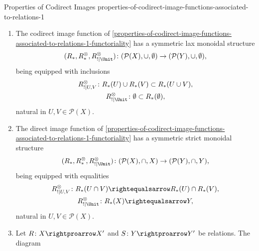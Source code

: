 \begin{proposition}{Properties of Codirect Images \rmI}{properties-of-codirect-image-functions-associated-to-relations-1}
\begin{enumerate}
\[            \]%
            natural in $U,V\in\mathcal{P}(X)$.
        \item\label{properties-of-codirect-image-functions-associated-to-relations-1-symmetric-lax-monoidality-with-respect-to-unions}The codirect image function of \cref{properties-of-codirect-image-functions-associated-to-relations-1-functoriality} has a symmetric lax monoidal structure
            \[
                (R_{*},R^{\otimes}_{*},R^{\otimes}_{!|\Unit})
                \colon
                (\mathcal{P}(X),\cup,\emptyset)
                \to
                (\mathcal{P}(Y),\cup,\emptyset),
            \]%
            being equipped with inclusions%
            \[
                \begin{gathered}
                    R^{\otimes}_{!|U,V}   \colon R_{*}(U)\cup R_{*}(V) \subset R_{*}(U\cup V),\\
                    R^{\otimes}_{!|\Unit} \colon \emptyset               \subset R_{*}(\emptyset),
                \end{gathered}
            \]%
            natural in $U,V\in\mathcal{P}(X)$.
        \item\label{properties-of-codirect-image-functions-associated-to-relations-1-symmetric-strict-monoidality-with-respect-to-intersections}The direct image function of \cref{properties-of-codirect-image-functions-associated-to-relations-1-functoriality} has a symmetric strict monoidal structure
            \[
                (R_{*},R^{\otimes}_{*},R^{\otimes}_{!|\Unit})
                \colon
                (\mathcal{P}(X),\cap,X)
                \to
                (\mathcal{P}(Y),\cap,Y),
            \]%
            being equipped with equalities%
            \[
                \begin{gathered}
                    R^{\otimes}_{!|U,V}   \colon R_{*}(U\cap V) \rightequalsarrow R_{*}(U)\cap R_{*}(V),\\
                    R^{\otimes}_{!|\Unit} \colon R_{*}(X)       \rightequalsarrow Y,
                \end{gathered}
            \]%
            natural in $U,V\in\mathcal{P}(X)$.
        \item\label{properties-of-codirect-image-functions-associated-to-relations-1-interaction-with-coproducts}Let $R\colon X\rightproarrow X'$ and $S\colon Y\rightproarrow Y'$ be relations. The diagram

\end{enumerate}
\end{proposition}
